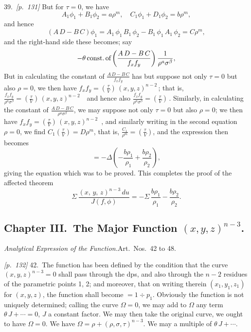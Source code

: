 \documentclass[11pt,a4paper]{book}
\begin{document}
39.\ \textit{[p.~131]} But for $\tau = 0$, we have
\[
A_1 \phi_1 + B_1 \phi_2 = a\rho^{m},\quad C_1 \phi_1 + D_1 \phi_2 = b\rho^{m},
\]
and hence
\[
(A\,D - B\,C)\phi_1 = A_1\,\phi_1\,B_1\,\phi_2 - B_1\,\phi_1\,A_1\,\phi_2 = C\rho^{m},
\]
and the right-hand side these becomes; say
\[
- \theta\,\text{const.\,of}\left(\frac{A\,D - B\,C}{f_x f_y}\right)\frac{1}{\rho^a \sigma^\beta},
\]
But in calculating the constant of $\frac{A\,D - B\,C}{f_x f_y}$ has but suppose not only $\tau = 0$ but also $\rho = 0$, we then have $f_x f_y = \left(\frac{\tau}{V}\right)\,(x, y, z)^{n - 2}\,$; that is, $\frac{f_x f_y}{\rho^a \sigma^\beta} = \left(\frac{\tau}{V}\right)\,(x, y, z)^{n - 2}\,$\,$\,$\, and hence also $\frac{f_x f_y}{\rho^a \sigma^\beta} = \left(\frac{\tau}{V}\right)\,$.
Similarly, in calculating the constant of $\frac{A\,D - B\,C}{\rho^a \sigma^\beta}$, we may suppose not only $\tau = 0$ but also $\rho = 0$; we then have $f_x f_y = \left(\frac{\tau}{V}\right)\,(x, y, z)^{n - 2}$\,$\,$\,, and similarly writing in the second equation $\rho = 0$, we find $C_1\left(\frac{\tau}{V}\right) = D\rho^m$, that is, $\frac{C_1}{\rho^m} = \left(\frac{\tau}{V}\right)$, and the expression then becomes
\[
= -\Delta\left(-\frac{b\rho_1}{\rho_1} + \frac{b\rho_2}{\rho_2}\right),
\]
giving the equation which was to be proved. This completes the proof of the affected theorem
\[
\Sigma\,\frac{(x,\,y,\,z)^{n - 3}\,du}{J(f, \phi)} = -\Sigma\,\frac{b\rho_1}{\rho_1} - \frac{b\rho_2}{\rho_2}.
\]

\subsection*{Chapter III.\ The Major Function $(x, y, z)^{n - 3}$.}

\textit{Analytical Expression of the Function.}\quad Art.\ Nos.~42 to 48.

\noindent\textit{[p.~132]} 42.\ The function has been defined by the condition that the curve $(x, y, z)^{n - 3} = 0$ shall pass through the dps, and also through the $n - 2$ residues of the parametric points 1, 2; and moreover, that on writing therein $(x_1, y_1, z_1)$ for $(x, y, z)$, the function shall become $= 1 \div p_1$. Obviously the function is not uniquely determined; calling the curve $\Omega = 0$, we may add to $\Omega$ any term $\theta\,J + \cdots = 0$, $J$ a constant factor. We may then take the original curve, we ought to have $\Omega = 0$. We have $\Omega = \rho + (\rho, \sigma, \tau)^{n - 3}$. We may a multiple of $\theta\,J + \cdots$.
\end{document}
